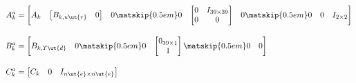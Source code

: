 \begin{equation}
  \begin{split}
    A_k^a & =
    \begin{bmatrix}
      A_k & \begin{bmatrix} B_{k,u\ut{r}} & 0 \end{bmatrix} & 0\matskip{0.5em}
      0 & \begin{bmatrix} 0 & I_{39\times 39}\\ 0 & 0\end{bmatrix} & 0\matskip{0.5em}
      0 & 0 & I_{2\times 2}
    \end{bmatrix}\\[1em]
    B_k^a & = 
    \begin{bmatrix}
      B_{k,T\ut{d}} & 0\matskip{0.5em}
      0 & \begin{bmatrix} 0_{39\times 1}\\ 1 \end{bmatrix} \matskip{0.5em}
      0 & 0
    \end{bmatrix}\\[1em]
    C_k^a & = \begin{bmatrix}
      C_k & 0 & I_{n\ut{e} \times n\ut{e}}
    \end{bmatrix}
  \end{split}
\end{equation}


